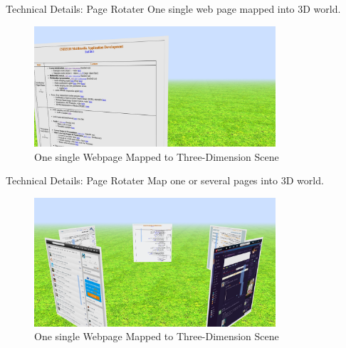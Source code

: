 \documentclass{beamer}
\begin{document}
\begin{frame}{Technical Details: Page Rotater}
One single web page mapped into 3D world.
\begin{center}
    \begin{figure}
        \includegraphics[width=0.8\textwidth]{./images/3d_webpage.png}
        \caption{One single Webpage Mapped to Three-Dimension Scene}
    \end{figure}
\end{center}
\begin{center}
\end{center}
\end{frame}

\begin{frame}{Technical Details: Page Rotater}
Map one or several pages into 3D world.
\begin{center}
    \begin{figure}
        \includegraphics[width=0.8\textwidth]{./images/multi-3d-webpages.png}
        \caption{One single Webpage Mapped to Three-Dimension Scene}
    \end{figure}
\end{center}
\begin{center}
\end{center}
\end{frame}
\end{document}
